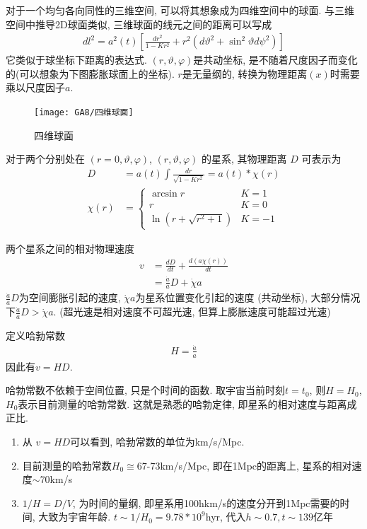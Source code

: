 对于一个均匀各向同性的三维空间, 可以将其想象成为四维空间中的球面. 与三维空间中推导2D球面类似, 三维球面的线元之间的距离可以写成
\begin{align}
    d l^2=a^2(t)\left[ \frac{d r^2}{1-K r^2}+r^2(d \vartheta^2 +\sin^2 \vartheta d \psi^2 ) \right] \label{E0}
\end{align}
它类似于球坐标下距离的表达式. $(r, \vartheta, \varphi)$是共动坐标, 是不随着尺度因子而变化的(可以想象为下图膨胀球面上的坐标).  $r$是无量纲的, 转换为物理距离$(x)$时需要乘以尺度因子$a$. 

\begin{figure}[!htb]
    \centering
    \texttt{[image: GA8/四维球面]}
    \caption{四维球面}
\end{figure}

对于两个分别处在 $(r=0, \vartheta, \varphi)$, $(r, \vartheta, \varphi)$ 的星系, 其物理距离 $D$ 可表示为
\begin{align*}
    D&=a(t)\int \frac{dr}{\sqrt{1-Kr^2}}=a(t)*\chi (r)\\
    \chi (r) &=\left\{ \begin{array}{ll}
        \arcsin r & K=1\\
        r & K=0\\
        \ln(r+\sqrt{r^2+1}) & K=-1
    \end{array} \right.
\end{align*}

两个星系之间的相对物理速度
\begin{align*}
    v&=\frac{d D}{dt}+\frac{d(a \chi(r))}{dt} \\
    &=\frac{\dot{a}}{a}D+\dot{\chi}a
\end{align*}
$\frac{\dot{a}}{a}D$为空间膨胀引起的速度, $\dot{\chi}a$为星系位置变化引起的速度 (共动坐标), 大部分情况下$\frac{\dot{a}}{a}D>\dot{\chi}a$. (超光速是相对速度不可超光速, 但算上膨胀速度可能超过光速)

定义哈勃常数
\begin{align*}
    H=\frac{\dot{a}}{a}
\end{align*}
因此有$v=HD$. 

哈勃常数不依赖于空间位置, 只是个时间的函数. 取宇宙当前时刻$t=t_0$, 则$H=H_0$, $H_0$表示目前测量的哈勃常数. 这就是熟悉的哈勃定律, 即星系的相对速度与距离成正比. 

\begin{enumerate}\small
    \item 从 $v=HD$可以看到, 哈勃常数的单位为km/s/Mpc. 
    \item 目前测量的哈勃常数$H_0 \cong  67$-73km/s/Mpc, 即在1Mpc的距离上, 星系的相对速度$\sim$70km/s
    \item $1/H=D/V$, 为时间的量纲, 即星系用100hkm/s的速度分开到1Mpc需要的时间, 大致为宇宙年龄. $t\sim 1/H_0 =9.78*10^9 $hyr, 代入$h\sim 0.7, t\sim 139$亿年
\end{enumerate}

